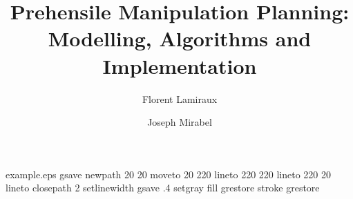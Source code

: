 %
%
%
%
%
\begin{filecontents*}{example.eps}
gsave
newpath
  20 20 moveto
  20 220 lineto
  220 220 lineto
  220 20 lineto
closepath
2 setlinewidth
gsave
  .4 setgray fill
grestore
stroke
grestore
\end{filecontents*}
%
\RequirePackage{fix-cm}
%
\documentclass[twocolumn]{svjour3}          %
%
\smartqed  %
%
\usepackage{graphicx}
\usepackage{color}
\usepackage{amsmath}
\usepackage{amsfonts}
\usepackage{amssymb}
\usepackage{hyperref}
\usepackage{moreverb,url}
\usepackage{xspace}
\usepackage{algorithm}
\usepackage[noend]{algpseudocode}
\usepackage{yfonts}



%


\title{Prehensile Manipulation Planning: Modelling, Algorithms and Implementation}


\author{Florent Lamiraux         \and
        Joseph Mirabel %
}


